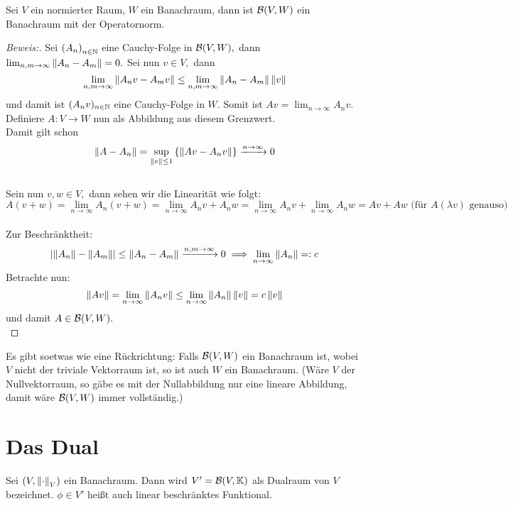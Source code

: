 \begin{theorem}
    Sei $V$ ein normierter Raum, $W$ ein Banachraum, dann ist $\mathcal{B}(V, W)$ ein Banachraum mit der Operatornorm.
    \label{B(V,W)_Banach}
    \begin{proof}[Beweis:] Sei $\left (A_n\right )_{n\in \mathbb{N}}$ eine Cauchy-Folge in $\mathcal{B}(V, W),$ dann $\lim_{n, m \to\infty}{\left\lVert A_n - A_m\right\rVert} = 0.$ Sei nun $v \in V,$ dann \[\lim_{n, m \to\infty}{\left\lVert A_nv- A_mv\right\rVert} \leq \lim_{n, m \to\infty}{\left\lVert A_n - A_m\right\rVert\left\lVert v\right\rVert}\] und damit ist $(A_nv)_{n \in \mathbb{N}}$ eine Cauchy-Folge in $W.$ Somit ist $Av = \lim_{n \to \infty}{A_nv}$. Definiere $A: V \to W$ nun als Abbildung aus diesem Grenzwert. \\
    Damit gilt schon \[\left\lVert A - A_n\right\rVert = \sup_{\left\lVert v\right\rVert \leq 1}{\left\{\left\lVert Av-A_nv\right\rVert\right\}} \xrightarrow{n \to \infty} 0\] \\
    Sein nun $v, w \in V,$ dann sehen wir die Linearität wie folgt: \[A(v+w) = \lim_{n \to \infty}{A_n(v+w)} = \lim_{n \to \infty}{A_nv + A_nw} = \lim_{n \to \infty}{A_nv} + \lim_{n \to \infty}{A_nw} = Av + Aw \text{ (für $A(\lambda v)$ genauso)}\] \\
    Zur Beschränktheit: \[\left\lvert \left\lVert A_n\right\rVert-\left\lVert A_m\right\rVert \right\rvert \leq \left\lVert A_n - A_m\right\rVert \xrightarrow{n, m \to \infty} 0 \implies \lim_{n \to \infty}{\left\lVert A_n\right\rVert}=:c\] Betrachte nun: \[\left\lVert Av\right\rVert = \lim_{n \to \infty}{\left\lVert A_nv\right\rVert} \leq \lim_{n \to \infty}{\left\lVert A_n\right\rVert\left\lVert v\right\rVert} = c \left\lVert v\right\rVert\] und damit $A \in \mathcal{B}(V, W).$ \\
    \end{proof}
\end{theorem}
 \begin{rem}
     Es gibt soetwas wie eine Rückrichtung: Falls $\mathcal{B}(V, W)$ ein Banachraum ist, wobei $V$ nicht der triviale Vektorraum ist, so ist auch $W$ ein Banachraum. (Wäre $V$ der Nullvektorraum, so gäbe es mit der Nullabbildung nur eine lineare Abbildung, damit wäre $\mathcal{B}(V,W)$ immer vollständig.)
 \end{rem}
\section{Das Dual}

\begin{definition}
    Sei $(V, \left\lVert\cdot\right\rVert_V)$ ein Banachraum. Dann wird $V' = \mathcal{B}(V, \mathbb{K})$ als Dualraum von $V$ bezeichnet. $\phi \in V'$ heißt auch linear beschränktes Funktional.
\end{definition}
\begin{definition}
    
\end{definition}

